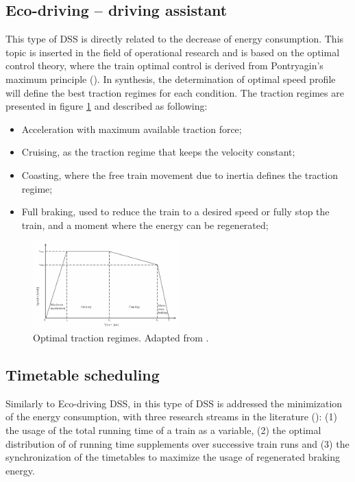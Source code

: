 \subsection{Eco-driving – driving assistant}
\label{subs:352}

	This type of DSS is directly related to the decrease of energy consumption. This topic is inserted in the field of operational research and is based on the optimal control theory, where the train optimal control is derived from Pontryagin's maximum principle (\cite{pontryagin1963}).  
	In synthesis, the determination of optimal speed profile will define the best traction regimes for each condition. The traction regimes are presented in figure \ref{fig:scheepmaker2017a} and described as following:
	
	\begin{itemize}
		\setlength\itemsep{-0.5em}
		\item Acceleration with maximum available traction force;
		\item Cruising, as the traction regime that keeps the velocity constant;
		\item Coasting, where the free train movement due to inertia defines the traction regime;
		\item Full braking, used to reduce the train to a desired speed or fully stop the train, and a moment where the energy can be regenerated;
	\end{itemize}
	
	\begin{figure}[h!]
		\centering
		\includegraphics[width=0.5\textwidth,keepaspectratio]{figures/3.5.DSS/scheepmaker2017a}
		\caption{Optimal traction regimes. Adapted from \cite{scheepmaker2017}.}
		\label{fig:scheepmaker2017a}
	\end{figure}
	
	

\subsection{Timetable scheduling}
\label{subs:353}

	Similarly to Eco-driving DSS, in this type of DSS is addressed the minimization of the energy consumption, with three research streams in the literature (\cite{scheepmaker2017}): (1) the usage of the total running time of a train as a variable, (2) the optimal distribution of of running time supplements over successive train runs and (3) the synchronization of the timetables to maximize the usage of regenerated braking energy.
	
	
	
